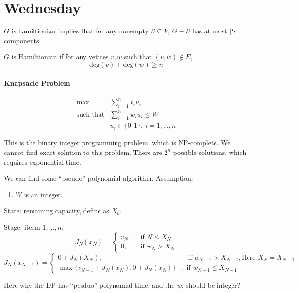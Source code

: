 \section{Wednesday}

\begin{proposition}
$G$ is hamiltionian implies that for any nonempty $S\subseteq V$, $G-S$ has at most $|S|$ components.
\end{proposition}
\begin{theorem}
$G$ is Hamiltionian if for any vetices $v,w$ such that $(v,w)\notin E$,
\[
\mbox{deg}(v)+\mbox{deg}(w)\ge n
\]
\end{theorem}


\paragraph{Knapsacle Problem}
\[
\begin{array}{ll}
\max&\sum_{i=1}^nv_iu_i\\
\mbox{such that}&\sum_{i=1}^nw_iu_i\le W\\
&u_i\in\{0,1\},\ i=1,\dots,n
\end{array}
\]

This is the binary integer programming problem, which is NP-complete. We cannot find exact solution to this problem. There are $2^n$ possible solutions, which requires exponential time.

We can find some ``pseudo''-polynomial algorithm. Assumption:
\begin{enumerate}
\item
$W$ is an integer. 

\end{enumerate}

State: remaining capacity, define as $X_k$.

Stage: iterm $1,\dots,n$.
\[
J_N(x_N)=\left\{
\begin{aligned}
v_N &\quad\text{if }N\le X_N\\
0,&\quad\text{if }w_N>X_N
\end{aligned}
\right.
\]
\[
J_N(x_{N-1})
=
\left\{
\begin{aligned}
0+J_N(X_N),&\quad\text{if }w_{N-1}>X_{N-1}, \text{Here }X_N=X_{N-1}\\
\max\{v_{N-1}+J_N(x_N), 0+J_N(x_N)\}&,\text{ if }w_{N-1}\le X_{N-1}
\end{aligned}
\right.
\]

Here why the DP has ``pesduo''-polynomial time, and the $w_i$ should be integer?

